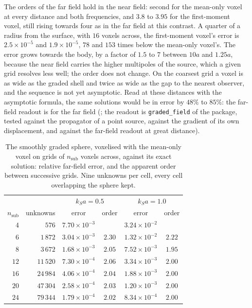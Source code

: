 \documentclass[preprint,review,12pt]{elsarticle}
\begin{document}
The orders of the far field hold in the near field: second for the mean-only voxel at every distance
and both frequencies, and $3.8$ to $3.95$ for the first-moment voxel, still rising towards four as in
the far field at this contrast. A quarter of a radius from the surface, with $16$ voxels across, the
first-moment voxel's error is $2.5\times10^{-5}$ and $1.9\times10^{-5}$, $78$ and $153$ times below the
mean-only voxel's. The error grows towards the body, by a factor of $1.5$ to $7$ between $10a$ and $1.25a$,
because the near field carries the higher multipoles of the source, which a given grid resolves less
well; the order does not change. On the coarsest grid a voxel is as wide as the graded shell and twice as
wide as the gap to the nearest observer, and the sequence is not yet asymptotic. Read at these distances
with the asymptotic formula, the same solutions would be in error by $48\%$ to $85\%$: the far-field
readout is for the far field
(; the readout is
\texttt{graded\_field} of the package, tested against the propagator of a point source, against the
gradient of its own displacement, and against the far-field readout at great distance).

\begin{table}[htbp]
\centering
\caption{The smoothly graded sphere, voxelised with the mean-only voxel on grids of $n_{\mathrm{sub}}$
voxels across, against its exact solution: relative far-field error, and the apparent order between
successive grids. Nine unknowns per cell, every cell overlapping the sphere kept.}
\label{tab:spheregraded}
\small
\begin{tabular}{@{}rrcccc@{}}
\toprule
 & & \multicolumn{2}{c}{$k_Sa=0.5$} & \multicolumn{2}{c}{$k_Sa=1.0$} \\
$n_{\mathrm{sub}}$ & unknowns & error & order & error & order \\
\midrule
$4$  & $576$    & $7.70\times10^{-3}$ &        & $3.24\times10^{-2}$ &        \\
$6$  & $1\,872$  & $3.04\times10^{-3}$ & $2.30$ & $1.32\times10^{-2}$ & $2.22$ \\
$8$  & $3\,672$  & $1.68\times10^{-3}$ & $2.05$ & $7.52\times10^{-3}$ & $1.95$ \\
$12$ & $11\,520$ & $7.30\times10^{-4}$ & $2.06$ & $3.34\times10^{-3}$ & $2.00$ \\
$16$ & $24\,984$ & $4.06\times10^{-4}$ & $2.04$ & $1.88\times10^{-3}$ & $2.00$ \\
$20$ & $47\,304$ & $2.58\times10^{-4}$ & $2.03$ & $1.20\times10^{-3}$ & $2.00$ \\
$24$ & $79\,344$ & $1.79\times10^{-4}$ & $2.02$ & $8.34\times10^{-4}$ & $2.00$ \\
\bottomrule
\end{tabular}
\end{table}
\end{document}
